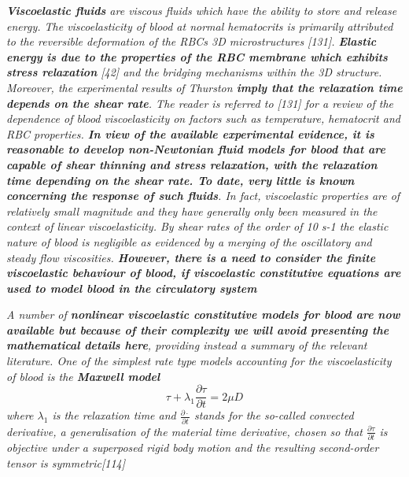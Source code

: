 \documentclass[11pt,letterpaper]{article}
\begin{document}
\textit{\textbf{Viscoelastic fluids} are viscous fluids which have the ability to store and release energy. The viscoelasticity of blood at normal hematocrits is primarily attributed to the reversible deformation of the RBCs 3D microstructures [131]. \textbf{Elastic energy is due to the properties of the RBC membrane which exhibits stress relaxation }[42] and the bridging mechanisms within the 3D structure. Moreover, the experimental results of Thurston \textbf{imply that the relaxation time depends on the shear rate}. The reader is referred to [131] for a review of the dependence of blood viscoelasticity on factors such as temperature, hematocrit and RBC properties. {\color{blue}\textbf{In view of the available experimental evidence, it is reasonable to develop non-Newtonian fluid models for blood that are capable of shear thinning and stress relaxation, with the relaxation time depending on the shear rate. To date, very little is known concerning the response of such fluids}}. In fact, viscoelastic properties are of relatively small magnitude and they have generally only been measured in the context of linear viscoelasticity. By shear rates of the order of 10 s-1 the elastic nature of blood is negligible as evidenced by a merging of the oscillatory and steady flow viscosities. \textbf{However, there is a need to consider the finite viscoelastic behaviour of blood, if viscoelastic constitutive equations are used to model blood in the circulatory system}}

\textit{A number of \textbf{nonlinear viscoelastic constitutive models for blood are now available but because of their complexity we will avoid presenting the mathematical details here}, providing instead a summary of the relevant literature. One of the simplest rate type models accounting for the viscoelasticity of blood is the {\color{red}\textbf{Maxwell model}}
\begin{equation}
    \tau + \lambda_1\frac{\partial \tau}{\partial t} = 2\mu D
\end{equation}
where $\lambda_1$ is the relaxation time and $\frac{\partial \cdot}{\partial t}$ stands for the so-called convected derivative, a generalisation of the material time derivative, chosen so that $\frac{\partial \tau}{\partial t}$  is objective under a superposed rigid body motion and the resulting second-order tensor is symmetric[114] }                                   
\end{document}
